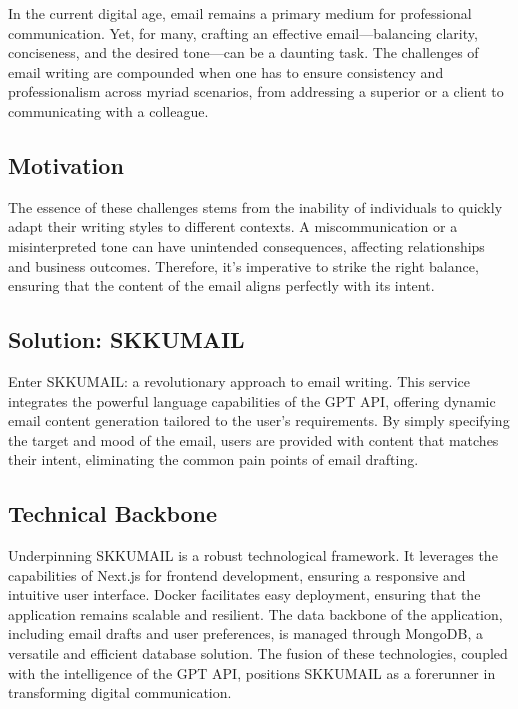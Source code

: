 In the current digital age, email remains a primary medium for professional communication. Yet, for many, crafting an effective email—balancing clarity, conciseness, and the desired tone—can be a daunting task. The challenges of email writing are compounded when one has to ensure consistency and professionalism across myriad scenarios, from addressing a superior or a client to communicating with a colleague. 

\subsection{Motivation}

The essence of these challenges stems from the inability of individuals to quickly adapt their writing styles to different contexts. A miscommunication or a misinterpreted tone can have unintended consequences, affecting relationships and business outcomes. Therefore, it's imperative to strike the right balance, ensuring that the content of the email aligns perfectly with its intent.

\subsection{Solution: SKKUMAIL}

Enter SKKUMAIL: a revolutionary approach to email writing. This service integrates the powerful language capabilities of the GPT API, offering dynamic email content generation tailored to the user's requirements. By simply specifying the target and mood of the email, users are provided with content that matches their intent, eliminating the common pain points of email drafting.

\subsection{Technical Backbone}

Underpinning SKKUMAIL is a robust technological framework. It leverages the capabilities of Next.js for frontend development, ensuring a responsive and intuitive user interface. Docker facilitates easy deployment, ensuring that the application remains scalable and resilient. The data backbone of the application, including email drafts and user preferences, is managed through MongoDB, a versatile and efficient database solution. The fusion of these technologies, coupled with the intelligence of the GPT API, positions SKKUMAIL as a forerunner in transforming digital communication.


